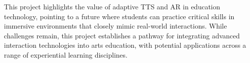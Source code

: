 This project highlights the value of adaptive TTS and AR in education technology, pointing to a future where students can practice critical skills in immersive environments that closely mimic real-world interactions. While challenges remain, this project establishes a pathway for integrating advanced interaction technologies into arts education, with potential applications across a range of experiential learning disciplines.

